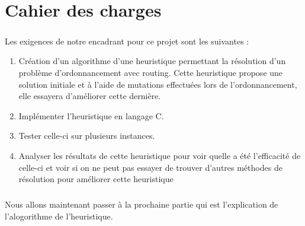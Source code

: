 \chapter{Cahier des charges}

	\paragraph{}
		Les exigences de notre encadrant pour ce projet sont les suivantes :
\begin{enumerate}
\item Création d'un algorithme d'une heuristique permettant la résolution d'un problème d'ordonnancement avec routing. Cette heuristique propose une solution initiale et à l'aide de mutations effectuées lors de l'ordonnancement, elle essayera d'améliorer cette dernière.
\item Implémenter l'heuristique en langage C.
\item Tester celle-ci sur plusieurs instances.
\item Analyser les résultats de cette heuristique pour voir quelle a été l'efficacité de celle-ci et voir si on ne peut pas essayer de trouver d'autres méthodes de résolution pour améliorer cette heuristique
\end{enumerate} 

	\paragraph{}
	Nous allons maintenant passer à la prochaine partie qui est l'explication de l'alogorithme de l'heuristique.